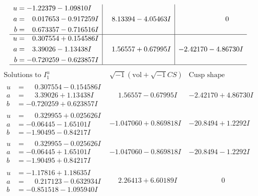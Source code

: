 \documentclass[1p]{elsarticle_modified}
\theoremstyle{definition}
\newcommand{\I}{\sqrt{-1}}
\begin{document}
$$\begin{array}{c|c|c}
\begin{aligned}
u &= -1.22379 - 1.09810 I \\
a &= \phantom{-}0.017653 - 0.917259 I \\
b &= \phantom{-}0.673357 - 0.716516 I\end{aligned}
 & \phantom{-}8.13394 - 4.05463 I & \phantom{-0.000000 } 0 \\ \hline\begin{aligned}
u &= \phantom{-}0.307554 + 0.154586 I \\
a &= \phantom{-}3.39026 - 1.13438 I \\
b &= -0.720259 - 0.623857 I\end{aligned}
 & \phantom{-}1.56557 + 0.67995 I & -2.42170 - 4.86730 I\\
 \hline 
 \end{array}$$\newpage$$\begin{array}{c|c|c}  
\text{Solutions to }I^u_{1}& \I (\text{vol} + \sqrt{-1}CS) & \text{Cusp shape}\\
 \hline 
\begin{aligned}
u &= \phantom{-}0.307554 - 0.154586 I \\
a &= \phantom{-}3.39026 + 1.13438 I \\
b &= -0.720259 + 0.623857 I\end{aligned}
 & \phantom{-}1.56557 - 0.67995 I & -2.42170 + 4.86730 I \\ \hline\begin{aligned}
u &= \phantom{-}0.329955 + 0.025626 I \\
a &= -0.06445 - 1.65101 I \\
b &= -1.90495 - 0.84217 I\end{aligned}
 & -1.047060 + 0.869818 I & -20.8494 + 1.2292 I \\ \hline\begin{aligned}
u &= \phantom{-}0.329955 - 0.025626 I \\
a &= -0.06445 + 1.65101 I \\
b &= -1.90495 + 0.84217 I\end{aligned}
 & -1.047060 - 0.869818 I & -20.8494 - 1.2292 I \\ \hline\begin{aligned}
u &= -1.17816 + 1.18635 I \\
a &= \phantom{-}0.217123 - 0.632934 I \\
b &= -0.851518 - 1.095940 I\end{aligned}
 & \phantom{-}2.26413 + 6.60189 I & \phantom{-0.000000 } 0 \\ \hline\begin{aligned}

\end{aligned}
\end{array}$$
\end{document}

